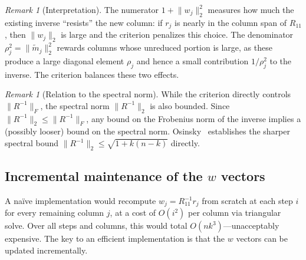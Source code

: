 \documentclass[11pt]{article}
\theoremstyle{definition}
\theoremstyle{remark}
\newtheorem{remark}[theorem]{Remark}
\newcommand{\fnorm}[1]{\lVert #1 \rVert_F}
\newcommand{\tnorm}[1]{\lVert #1 \rVert_2}
\begin{document}
\begin{remark}[Interpretation]\label{rem:interp}
The numerator $1 + \tnorm{w_j}^2$ measures how much the existing
inverse ``resists'' the new column: if $r_j$ is nearly in the column
span of $R_{11}$, then $\tnorm{w_j}$ is large and the criterion
penalizes this choice.  The denominator $\rho_j^2 =
\tnorm{\tilde{m}_j}^2$ rewards columns whose unreduced portion is
large, as these produce a large diagonal element $\rho_j$ and hence a
small contribution $1/\rho_j^2$ to the inverse.  The criterion
balances these two effects.
\end{remark}

\begin{remark}[Relation to the spectral norm]\label{rem:spectral}
While the criterion directly controls $\fnorm{R^{-1}}$, the spectral
norm $\tnorm{R^{-1}}$ is also bounded.  Since $\tnorm{R^{-1}} \leq
\fnorm{R^{-1}}$, any bound on the Frobenius norm of the inverse
implies a (possibly looser) bound on the spectral norm.
Osinsky~\cite{osinsky2025close} establishes the sharper spectral bound
$\tnorm{R^{-1}} \leq \sqrt{1 + k(n-k)}$ directly.
\end{remark}

\subsection{Incremental maintenance of the \texorpdfstring{$w$}{w} vectors}
\label{sec:w-update}

A na\"ive implementation would recompute $w_j = R_{11}^{-1} r_j$ from
scratch at each step $i$ for every remaining column $j$, at a cost of
$O(i^2)$ per column via triangular solve.  Over all steps and columns,
this would total $O(nk^3)$---unacceptably expensive.  The key to an
efficient implementation is that the $w$ vectors can be updated
incrementally.
\end{document}
